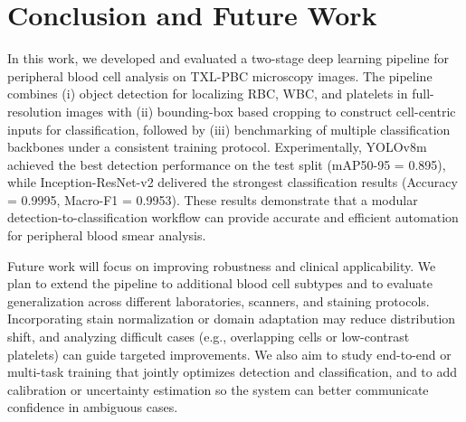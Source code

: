 \documentclass[conference]{IEEEtran}
\begin{document}
\section{Conclusion and Future Work}

In this work, we developed and evaluated a two-stage deep learning pipeline for peripheral blood cell analysis on TXL-PBC microscopy images. The pipeline combines (i) object detection for localizing RBC, WBC, and platelets in full-resolution images with (ii) bounding-box based cropping to construct cell-centric inputs for classification, followed by (iii) benchmarking of multiple classification backbones under a consistent training protocol. Experimentally, YOLOv8m achieved the best detection performance on the test split (mAP50-95 = 0.895), while Inception-ResNet-v2 delivered the strongest classification results (Accuracy = 0.9995, Macro-F1 = 0.9953). These results demonstrate that a modular detection-to-classification workflow can provide accurate and efficient automation for peripheral blood smear analysis.

Future work will focus on improving robustness and clinical applicability. We plan to extend the pipeline to additional blood cell subtypes and to evaluate generalization across different laboratories, scanners, and staining protocols. Incorporating stain normalization or domain adaptation may reduce distribution shift, and analyzing difficult cases (e.g., overlapping cells or low-contrast platelets) can guide targeted improvements. We also aim to study end-to-end or multi-task training that jointly optimizes detection and classification, and to add calibration or uncertainty estimation so the system can better communicate confidence in ambiguous cases.
\end{document}
